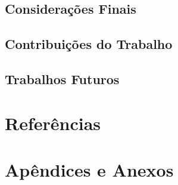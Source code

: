 \documentclass[a4paper,12pt]{article}
\begin{document}
\subsection{Considerações Finais}
\subsection{Contribuições do Trabalho}
\subsection{Trabalhos Futuros}

\section{Referências}

\section{Apêndices e Anexos}
\end{document}
